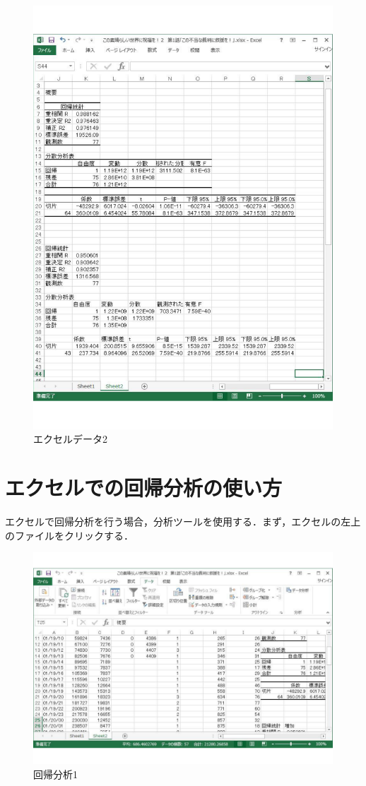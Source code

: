 \begin{figure}[htb]
\centering
\includegraphics[width=12cm]{de-ta05.pdf}
\caption{エクセルデータ2}\label{ace}
\end{figure}

\clearpage

\section{エクセルでの回帰分析の使い方}
エクセルで回帰分析を行う場合，分析ツールを使用する．まず，エクセルの左上のファイルをクリックする．

\begin{figure}[htb]
\centering
\includegraphics[width=14cm]{ekuseru02.pdf}
\caption{回帰分析1}\label{ace}
\end{figure}

